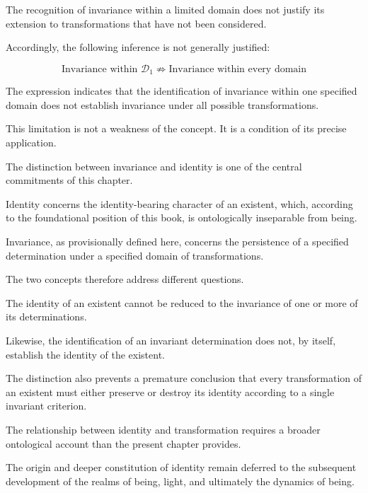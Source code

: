 The recognition of invariance within a limited
domain does not justify its extension to
transformations that have not been considered.

Accordingly, the following inference is not
generally justified:

\[
\text{Invariance within } \mathcal{D}_1
\not\Rightarrow
\text{Invariance within every domain}
\]

The expression indicates that the identification
of invariance within one specified domain does
not establish invariance under all possible
transformations.

This limitation is not a weakness of the concept.
It is a condition of its precise application.


The distinction between invariance and identity
is one of the central commitments of this chapter.

Identity concerns the identity-bearing character
of an existent, which, according to the foundational
position of this book, is ontologically inseparable
from being.

Invariance, as provisionally defined here,
concerns the persistence of a specified
determination under a specified domain of
transformations.

The two concepts therefore address different
questions.

The identity of an existent cannot be reduced
to the invariance of one or more of its
determinations.

Likewise, the identification of an invariant
determination does not, by itself, establish
the identity of the existent.

The distinction also prevents a premature
conclusion that every transformation of an
existent must either preserve or destroy
its identity according to a single invariant
criterion.

The relationship between identity and
transformation requires a broader ontological
account than the present chapter provides.

The origin and deeper constitution of identity
remain deferred to the subsequent development
of the realms of being, light, and ultimately
the dynamics of being.


